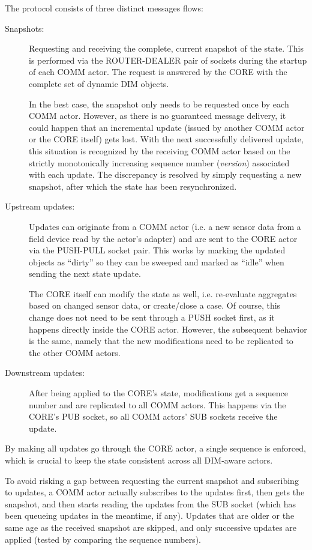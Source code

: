The protocol consists of three distinct messages flows:

\begin{description}
	\item [Snapshots:]
		Requesting and receiving the complete, current snapshot of the
		state. This is performed via the ROUTER-DEALER pair of sockets
		during the startup of each COMM actor. The request is answered
		by the CORE with the complete set of dynamic DIM objects.

		In the best case, the snapshot only needs to be requested once
		by each COMM actor. However, as there is no guaranteed message
		delivery, it could happen that an incremental update (issued by
		another COMM actor or the CORE itself) gets lost. With the next
		successfully delivered update, this situation is recognized by
		the receiving COMM actor based on the strictly monotonically
		increasing sequence number (\emph{version}) associated with
		each update. The discrepancy is resolved by simply requesting a
		new snapshot, after which the state has been resynchronized.

	\item [Upstream updates:]
		Updates can originate from a COMM actor (i.e. a new sensor data
		from a field device read by the actor's adapter) and are sent to the
		CORE actor via the PUSH-PULL socket pair.  This works by
		marking the updated objects as ``dirty'' so they can be sweeped
		and marked as ``idle'' when sending the next state update.

		The CORE itself can modify the state as well, i.e. re-evaluate
		aggregates based on changed sensor data, or create/close a
		case. Of course, this change does not need to be sent through a
		PUSH socket first, as it happens directly inside the CORE
		actor. However, the subsequent behavior is the same, namely
		that the new modifications need to be replicated to the other
		COMM actors.

	\item [Downstream updates:]
		After being applied to the CORE's state,
		modifications get a sequence number and are replicated to all
		COMM actors. This happens via the CORE's PUB socket, so all
		COMM actors' SUB sockets receive the update.
\end{description}

By making all updates go through the CORE actor, a single sequence is enforced,
which is crucial to keep the state consistent across all DIM-aware actors.

To avoid risking a gap between requesting the current snapshot and subscribing
to updates, a COMM actor actually subscribes to the updates first, then gets the
snapshot, and then starts reading the updates from the SUB socket (which has been
queueing updates in the meantime, if any). Updates that are older or the same
age as the received snapshot are skipped, and only successive updates are
applied (tested by comparing the sequence numbers).

